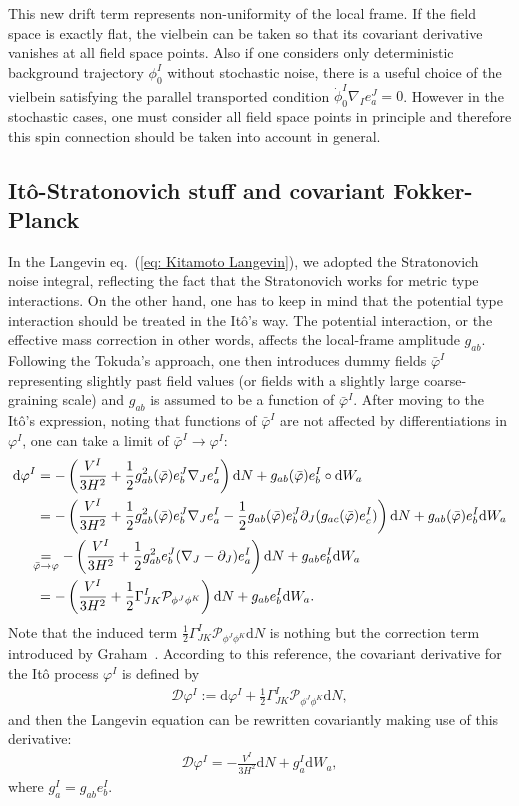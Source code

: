 \documentclass[aps, prd
, preprint
, nofootinbib 
, longbibliography
]{revtex4-1}
\newcommand{\dd}{\mathrm{d}}
\newcommand{\calD}{\mathcal{D}}
\newcommand{\calP}{\mathcal{P}}
\newcommand{\bae}[1]{\begin{align} #1 \end{align}}
\begin{document}
This new drift term represents non-uniformity of the local frame. If the field space is exactly flat,
the vielbein can be taken so that its covariant derivative vanishes at all field space points.
Also if one considers only deterministic background trajectory $\phi^I_0$ without stochastic noise,
there is a useful choice of the vielbein satisfying the parallel transported condition $\dot{\phi}_0^I\nabla_Ie^J_a=0$. 
However in the stochastic cases, one must consider all field space points in principle and therefore this spin connection should be taken into account in general.


\subsection{It\^o-Stratonovich stuff and covariant Fokker-Planck}\label{sec: Ito-Strato}

In the Langevin eq.~(\ref{eq: Kitamoto Langevin}), we adopted the Stratonovich noise integral, reflecting the fact that the Stratonovich works for metric type interactions.
On the other hand, one has to keep in mind that the potential type interaction should be treated in the It\^o's way.
The potential interaction, or the effective mass correction in other words, affects the local-frame amplitude $g_{ab}$.
Following the Tokuda's approach, one then introduces dummy fields $\bar{\varphi}^I$ representing slightly past field values (or fields with a slightly large coarse-graining scale) and $g_{ab}$ is assumed to be a function of $\bar{\varphi}^I$.
After moving to the It\^o's expression, noting that functions of $\bar{\varphi}^I$ are not affected by differentiations in $\varphi^I$, one can take a limit of $\bar{\varphi}^I\to\varphi^I$:
\bae{\label{eq: Ito in field space}
    \dd\varphi^I&=-\left(\frac{V^I}{3H^2}+\frac{1}{2}g^2_{ab}(\bar{\varphi})e^J_b\nabla_Je^I_a\right)\dd N
    +g_{ab}(\bar{\varphi})e^I_b\circ\dd W_a \nonumber \\
    &=-\left(\frac{V^I}{3H^2}+\frac{1}{2}g^2_{ab}(\bar{\varphi})e^J_b\nabla_Je^I_a-\frac{1}{2}g_{ab}(\bar{\varphi})e^J_b\partial_J(g_{ac}(\bar{\varphi})e^I_c)\right)\dd N+g_{ab}(\bar{\varphi})e^I_b\dd W_a \nonumber \\
    &\hspace{-5pt}\underset{\bar{\varphi}\to\varphi}{=}-\left(\frac{V^I}{3H^2}+\frac{1}{2}g^2_{ab}e^J_b(\nabla_J-\partial_J)e^I_a\right)\dd N+g_{ab}e^I_b\dd W_a \nonumber \\
    &=-\left(\frac{V^I}{3H^2}+\frac{1}{2}\Gamma^I_{JK}\calP_{\phi^J\phi^K}\right)\dd N+g_{ab}e^I_b\dd W_a.
}
Note that the induced term $\frac{1}{2}\Gamma^I_{JK}\calP_{\phi^J\phi^K}\dd N$ is nothing but the correction term introduced by Graham~\cite{graham1985covariant}.
According to this reference, the covariant derivative for the It\^o process $\varphi^I$ is defined by
\bae{
	\calD\varphi^I:=\dd\varphi^I+\frac{1}{2}\Gamma^I_{JK}\calP_{\phi^J\phi^K}\dd N,
}
and then the Langevin equation can be rewritten covariantly making use of this derivative:
\bae{
	\calD\varphi^I=-\frac{V^I}{3H^2}\dd N+g^I_a\dd W_a,
}
where $g^I_a=g_{ab}e^I_b$.
\end{document}
